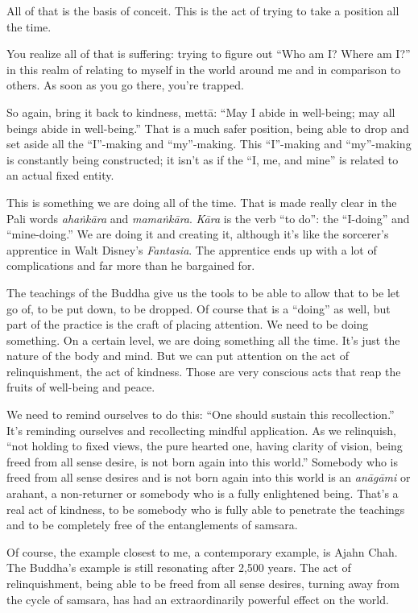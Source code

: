 All of that is the basis of conceit. This is the act of trying to take a
position all the time.

You realize all of that is suffering: trying to figure out “Who am I?
Where am I?” in this realm of relating to myself in the world around me
and in comparison to others. As soon as you go there, you’re trapped.

So again, bring it back to kindness, mettā: “May I abide in well-being;
may all beings abide in well-being.” That is a much safer position,
being able to drop and set aside all the “I”-making and “my”-making.
This “I”-making and “my”-making is constantly being constructed; it
isn’t as if the “I, me, and mine” is related to an actual fixed entity.

This is something we are doing all of the time. That is made really
clear in the Pali words \emph{ahaṅkāra} and \emph{mamaṅkāra}.
\emph{Kāra} is the verb “to do”: the “I-doing” and “mine-doing.” We are
doing it and creating it, although it’s like the sorcerer’s apprentice
in Walt Disney’s \emph{Fantasia}. The apprentice ends up with a lot of
complications and far more than he bargained for.

The teachings of the Buddha give us the tools to be able to allow that
to be let go of, to be put down, to be dropped. Of course that is a
“doing” as well, but part of the practice is the craft of placing
attention. We need to be doing something. On a certain level, we are
doing something all the time. It’s just the nature of the body and mind.
But we can put attention on the act of relinquishment, the act of
kindness. Those are very conscious acts that reap the fruits of
well-being and peace.

We need to remind ourselves to do this: “One should sustain this
recollection.” It’s reminding ourselves and recollecting mindful
application. As we relinquish, “not holding to fixed views, the pure
hearted one, having clarity of vision, being freed from all sense
desire, is not born again into this world.” Somebody who is freed from
all sense desires and is not born again into this world is an
\emph{anāgāmi} or arahant, a non-returner or somebody who is a fully
enlightened being. That’s a real act of kindness, to be somebody who is
fully able to penetrate the teachings and to be completely free of the
entanglements of samsara.

Of course, the example closest to me, a contemporary example, is Ajahn
Chah. The Buddha’s example is still resonating after 2,500 years. The
act of relinquishment, being able to be freed from all sense desires,
turning away from the cycle of samsara, has had an extraordinarily
powerful effect on the world.

